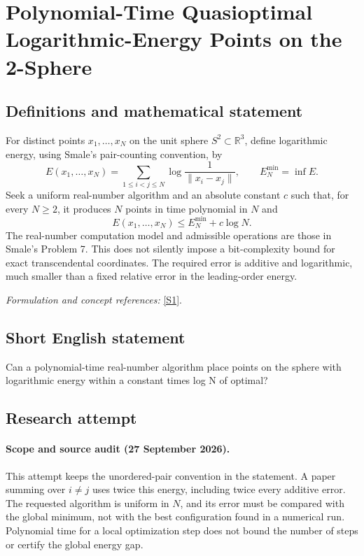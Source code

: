 \documentclass[11pt]{article}
\begin{document}
\section*{\texorpdfstring{Polynomial-Time Quasioptimal Logarithmic-Energy Points on the 2-Sphere}{Polynomial-Time Quasioptimal Logarithmic-Energy Points on the 2-Sphere}}\label{statement}
\subsection{Definitions and mathematical statement}
For distinct points $x_1,\ldots,x_N$ on the unit sphere $S^2\subset{\mathbb{R}}^3$, define logarithmic energy, using Smale's pair-counting convention, by
\[
 E(x_1,\ldots,x_N)=\sum_{1\le i<j\le N}
 \log\frac1{\|x_i-x_j\|},\qquad E_N^{\min}=\inf E.
\]
Seek a uniform real-number algorithm and an absolute constant $c$ such that, for every $N\ge2$, it produces $N$ points in time polynomial in $N$ and
\[
 E(x_1,\ldots,x_N)\le E_N^{\min}+c\log N.
\]
The real-number computation model and admissible operations are those in Smale's Problem 7. This does not silently impose a bit-complexity bound for exact transcendental coordinates. The required error is additive and logarithmic, much smaller than a fixed relative error in the leading-order energy.
\par\smallskip\textit{Formulation and concept references:} \href{https://www.cityu.edu.hk/ma/doc/people/smales/pap104.pdf}{[S1]}.

\subsection{Short English statement}
Can a polynomial-time real-number algorithm place points on the sphere with logarithmic energy within a constant times log N of optimal?
\subsection{Research attempt}
\paragraph{Scope and source audit (27 September 2026).}
This attempt keeps the unordered-pair convention in the statement. A
paper summing over $i\ne j$ uses twice this energy, including twice every
additive error. The requested algorithm is uniform in $N$, and its error
must be compared with the global minimum, not with the best configuration
found in a numerical run. Polynomial time for a local optimization step
does not bound the number of steps or certify the global energy gap.
\end{document}
